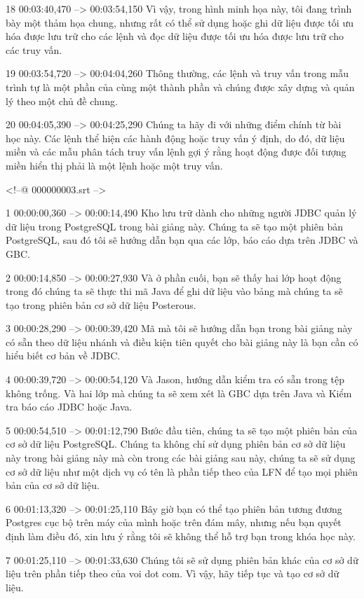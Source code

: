 18
00:03:40,470 --> 00:03:54,150
Vì vậy, trong hình minh họa này, tôi đang trình bày một thảm họa chung, nhưng rất có thể sử dụng hoặc ghi dữ liệu được tối ưu hóa được lưu trữ cho các lệnh và đọc dữ liệu được tối ưu hóa được lưu trữ cho các truy vấn.

19
00:03:54,720 --> 00:04:04,260
Thông thường, các lệnh và truy vấn trong mẫu trình tự là một phần của cùng một thành phần và chúng được xây dựng và quản lý theo một chủ đề chung.

20
00:04:05,390 --> 00:04:25,290
Chúng ta hãy đi với những điểm chính từ bài học này.  Các lệnh thể hiện các hành động hoặc truy vấn ý định, do đó, dữ liệu miền và các mẫu phân tách truy vấn lệnh gợi ý rằng hoạt động được đối tượng miền hiển thị phải là một lệnh hoặc một truy vấn.

<!--@ 000000003.srt -->

1
00:00:00,360 --> 00:00:14,490
Kho lưu trữ dành cho những người JDBC quản lý dữ liệu trong PostgreSQL trong bài giảng này.  Chúng ta sẽ tạo một phiên bản PostgreSQL, sau đó tôi sẽ hướng dẫn bạn qua các lớp, báo cáo dựa trên JDBC và GBC.

2
00:00:14,850 --> 00:00:27,930
Và ở phần cuối, bạn sẽ thấy hai lớp hoạt động trong đó chúng ta sẽ thực thi mã Java để ghi dữ liệu vào bảng mà chúng ta sẽ tạo trong phiên bản cơ sở dữ liệu Posterous.

3
00:00:28,290 --> 00:00:39,420
Mã mà tôi sẽ hướng dẫn bạn trong bài giảng này có sẵn theo dữ liệu nhánh và điều kiện tiên quyết cho bài giảng này là bạn cần có hiểu biết cơ bản về JDBC.

4
00:00:39,720 --> 00:00:54,120
Và Jason, hướng dẫn kiểm tra có sẵn trong tệp không trống.  Và hai lớp mà chúng ta sẽ xem xét là GBC dựa trên Java và Kiểm tra báo cáo JDBC hoặc Java.

5
00:00:54,510 --> 00:01:12,790
Bước đầu tiên, chúng ta sẽ tạo một phiên bản của cơ sở dữ liệu PostgreSQL.  Chúng ta không chỉ sử dụng phiên bản cơ sở dữ liệu này trong bài giảng này mà còn trong các bài giảng sau này, chúng ta sẽ sử dụng cơ sở dữ liệu như một dịch vụ có tên là phần tiếp theo của LFN để tạo mọi phiên bản của cơ sở dữ liệu.

6
00:01:13,320 --> 00:01:25,110
Bây giờ bạn có thể tạo phiên bản tương đương Postgres cục bộ trên máy của mình hoặc trên đám mây, nhưng nếu bạn quyết định làm điều đó, xin lưu ý rằng tôi sẽ không thể hỗ trợ bạn trong khóa học này.

7
00:01:25,110 --> 00:01:33,630
Chúng tôi sẽ sử dụng phiên bản khác của cơ sở dữ liệu trên phần tiếp theo của voi dot com.  Vì vậy, hãy tiếp tục và tạo cơ sở dữ liệu.

